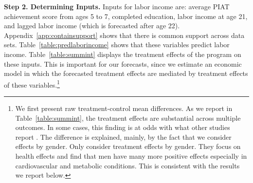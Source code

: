 \begin{figure}
\end{figure}

\textbf{Step 2. Determining Inputs.} Inputs for labor income are: average PIAT achievement score from ages 5 to 7, completed education, labor income at age 21, and lagged labor income (which is forecasted after age 22). Appendix~\ref{app:containsupport} shows that there is common support across data sets. Table~\ref{table:predlaborincome} shows that these variables predict labor income. Table~\ref{table:summint} displays the treatment effects of the program on these inputs. This is important for our forecasts, since we estimate an economic model in which the forecasted treatment effects are mediated by treatment effects of these variables.\footnote{We first present raw treatment-control mean differences. As we report in Table~\ref{table:summint}, the treatment effects are substantial across multiple outcomes. In some cases, this finding is at odds with what other studies report \citep{Ramey_etal_1985_Project-CARE_TiECSE,Clarke_Campbell_1998_ABC_Comparison_ECRQ,Campbell_Pungello_etal_2001_DP,Campbell_Ramey_etal_2002_ADS,Campbell_Wasik_etal_2008_ECRQ,Campbell_Conti_etal_2014_EarlyChildhoodInvestments}. The difference is explained, mainly, by the fact that we consider effects by gender.  Only \citet{Campbell_Conti_etal_2014_EarlyChildhoodInvestments} consider treatment effects by gender. They focus on health effects and find that men have many more positive effects especially in cardiovascular and metabolic conditions. This is consistent with the results we report below.}

